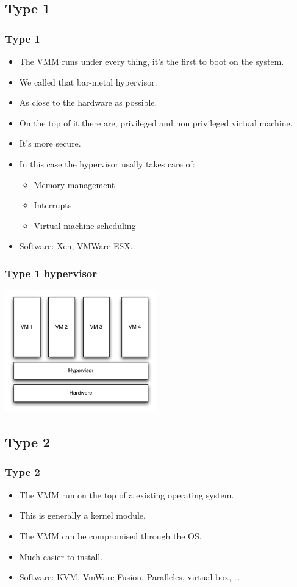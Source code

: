 \subsection{Type 1}
\begin{frame}
\frametitle{Type 1}
\begin{itemize}
\item The VMM runs under every thing, it's the first to boot on the
system.
\item We called that bar-metal hypervisor.
\item As close to the hardware as possible.
\item On the top of it there are, privileged and non privileged virtual
machine.
\item It's more secure.
\item In this case the hypervisor usally takes care of:
\begin{itemize}
\item Memory management
\item Interrupts
\item Virtual machine scheduling
\end{itemize}
\item Software: Xen, VMWare ESX.
\end{itemize}
\end{frame}

\begin{frame}
\begin{center}
\frametitle{Type 1 hypervisor}
\includegraphics[height=150pt]{pic/type_1}
\end{center}
\end{frame}


\subsection{Type 2}
\begin{frame}
\frametitle{Type 2}
\begin{itemize}
\item The VMM run on the top of a existing operating system.
\item This is generally a kernel module.
\item The VMM can be compromised through the OS.
\item Much easier to install.
\item Software: KVM, VmWare Fusion, Paralleles, virtual box, \ldots
\end{itemize}
\end{frame}

